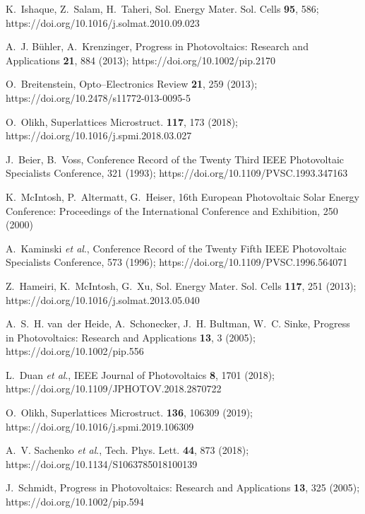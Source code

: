 ﻿\documentclass[12pt]{article}
\begin{document}
\begin{thebibliography}{99}

K.~Ishaque, Z.~Salam, H.~Taheri, Sol. Energy Mater. Sol. Cells \textbf{95}, 586;
  https://doi.org/10.1016/j.solmat.2010.09.023

A.~J. B\"{u}hler, A.~Krenzinger, Progress in Photovoltaics:
  Research and Applications \textbf{21}, 884 (2013);
 https://doi.org/10.1002/pip.2170

O.~Breitenstein, Opto--Electronics Review \textbf{21}, 259 (2013);
https://doi.org/10.2478/s11772-013-0095-5

O.~Olikh, Superlattices Microstruct. \textbf{117}, 173 (2018);
https://doi.org/10.1016/j.spmi.2018.03.027

J.~{Beier}, B.~{Voss}, Conference Record of the Twenty Third IEEE Photovoltaic
  Specialists Conference, 321 (1993);
https://doi.org/10.1109/PVSC.1993.347163

K.~McIntosh, P.~Altermatt, G.~Heiser, 16th European Photovoltaic
  Solar Energy Conference: Proceedings of the International Conference and
  Exhibition, 250 (2000)

A.~{Kaminski} \emph{et al}., Conference Record of the Twenty Fifth IEEE Photovoltaic Specialists Conference, 573 (1996);
https://doi.org/10.1109/PVSC.1996.564071

Z.~Hameiri, K.~McIntosh, G.~Xu, Sol. Energy Mater.
  Sol. Cells \textbf{117}, 251 (2013);
https://doi.org/10.1016/j.solmat.2013.05.040

A.~S.~H. van~der Heide, A.~Schonecker, J.~H. Bultman, W.~C. Sinke, Progress
  in Photovoltaics: Research and Applications \textbf{13}, 3 (2005);
https://doi.org/10.1002/pip.556

L.~{Duan}  \emph{et al}., IEEE Journal of
  Photovoltaics \textbf{8}, 1701 (2018);
https://doi.org/10.1109/JPHOTOV.2018.2870722

O.~Olikh, Superlattices Microstruct. \textbf{136}, 106309 (2019);
https://doi.org/10.1016/j.spmi.2019.106309

A.~V. Sachenko \emph{et al}., Tech. Phys. Lett. \textbf{44}, 873  (2018);
https://doi.org/10.1134/S1063785018100139

J.~Schmidt, Progress in Photovoltaics: Research and
  Applications \textbf{13}, 325 (2005);
https://doi.org/10.1002/pip.594


\end{thebibliography}
\end{document}
